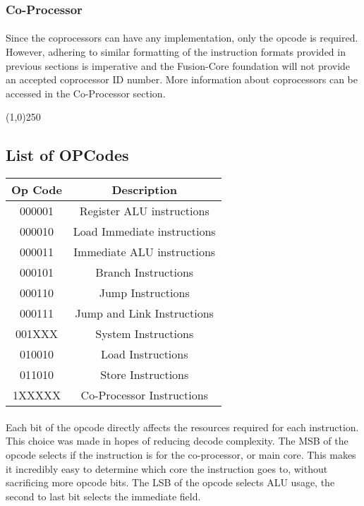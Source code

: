 \documentclass[letterpaper, 11pt]{article}
\begin{document}
\subsubsection{Co-Processor}

\paragraph{}Since the coprocessors can have any implementation, only the opcode is required. However, adhering to similar formatting of the instruction formats provided in previous sections is imperative and the Fusion-Core foundation will not provide an accepted coprocessor ID number. More information about coprocessors can be accessed in the Co-Processor section.
\begin{center}
	\line(1,0){250}
\end{center}

\newpage
\subsection{List of OPCodes}
	\begin{center}
		\begin{tabular}{|c|c|}
			\hline
			Op Code & Description 				 	\\ \hline
			000001	& Register ALU instructions	 	\\ \hline
			000010	& Load Immediate instructions 	\\ \hline
			000011	& Immediate ALU instructions	\\ \hline
			000101	& Branch Instructions		\\ \hline
			000110	& Jump Instructions				\\ \hline
			000111	& Jump and Link Instructions	\\ \hline
			001XXX	& System Instructions			\\ \hline
			010010	& Load Instructions				\\ \hline
			011010	& Store Instructions			\\ \hline
			1XXXXX	& Co-Processor Instructions		\\ \hline

		\end{tabular}
	\end{center}
\paragraph{} Each bit of the opcode directly affects the resources required for each instruction. This choice was made 
in hopes of reducing decode complexity. The MSB of the opcode selects if the instruction is for the co-processor,
or main core. This makes it incredibly easy to determine which core the instruction goes to, without sacrificing
more opcode bits. The LSB of the opcode selects ALU usage, the second to last bit selects the immediate field.
\end{document}
